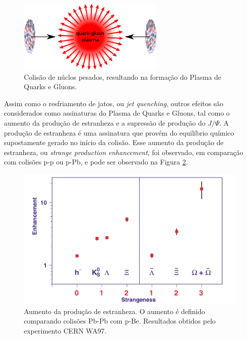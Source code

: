 %

\begin{figure}[!h]
 \centering
 \includegraphics[scale=1]{Content/qgp.png}
 \caption{Colisão de núclos pesados, resultando na formação do Plasma de Quarks e Gluons.}
 \label{qgp}
\end{figure}


Assim como o resfriamento de jatos, ou \emph{jet quenching}, outros efeitos são considerados como assinaturas do Plasma de Quarks e Gluons,
tal como o aumento da produção de estranheza e a supressão de produção do $J/\Psi$. A produção de estranheza é uma assinatura que provém do
equilíbrio químico supostamente gerado no início da colisão. Esse aumento da produção de estranheza, ou \emph{strange production enhancement},
foi observado, em comparação com colisões p-p ou p-Pb, e pode ser observado na Figura \ref{strangeness}.

\begin{figure}
 \centering
 \includegraphics[scale=.3]{Content/strangeness.png}
 \caption{Aumento da produção de estranheza. O aumento é definido comparando colisões Pb-Pb com p-Be. Resultados obtidos pelo experimento
 CERN WA97.}
 \label{strangeness}
\end{figure}